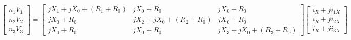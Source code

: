 \documentclass[english]{cobep-spec}
\begin{document}



\begin{figure}[!t]
	\normalsize
	
	\begin{equation}\label{eq:sys3matrix}
	\left[ {\begin{array}{*{20}{c}}
		{{n_1V_1}}\\
		{{n_2V_2}}\\
		{{n_3V_3}}
		\end{array}} \right] = \left[ {\begin{array}{*{20}{c}}
		{j{X_1} + j{X_0} + \left( {{R_1} + {R_0}} \right)}&{j{X_0} + {R_0}}&{j{X_0} + {R_0}}\\
		{j{X_0} + {R_0}}&{j{X_2} + j{X_0} + \left( {{R_2} + {R_0}} \right)}&{j{X_0} + {R_0}}\\
		{j{X_0} + {R_0}}&{j{X_0} + {R_0}}&{j{X_3} + j{X_0} + \left( {{R_3} + {R_0}} \right)}
		\end{array}} \right]\left[ {\begin{array}{*{20}{c}}
		{{i_R} + j{i_{1X}}}\\
		{{i_R} + j{i_{2X}}}\\
		{{i_R} + j{i_{3X}}}
		\end{array}} \right]
	\end{equation}
	

\end{figure}
\end{document}
